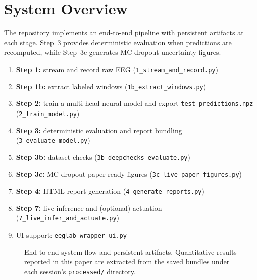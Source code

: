 \documentclass[conference]{IEEEtran}
\begin{document}
\section{System Overview}

The repository implements an end-to-end pipeline with persistent artifacts at each stage. Step~3 provides deterministic evaluation when predictions are recomputed, while Step~3c generates MC-dropout uncertainty figures.

\begin{enumerate}
\item \textbf{Step 1:} stream and record raw EEG (\texttt{1\_stream\_and\_record.py})
\item \textbf{Step 1b:} extract labeled windows (\texttt{1b\_extract\_windows.py})
\item \textbf{Step 2:} train a multi-head neural model and export \texttt{test\_predictions.npz} (\texttt{2\_train\_model.py})
\item \textbf{Step 3:} deterministic evaluation and report bundling (\texttt{3\_evaluate\_model.py})
\item \textbf{Step 3b:} dataset checks (\texttt{3b\_deepchecks\_evaluate.py})
\item \textbf{Step 3c:} MC-dropout paper-ready figures (\texttt{3c\_live\_paper\_figures.py})
\item \textbf{Step 4:} HTML report generation (\texttt{4\_generate\_reports.py})
\item \textbf{Step 7:} live inference and (optional) actuation (\texttt{7\_live\_infer\_and\_actuate.py})
\item UI support: \texttt{eeglab\_wrapper\_ui.py}
\end{enumerate}

\begin{figure}[t]
\centering
{}
\caption{End-to-end system flow and persistent artifacts. Quantitative results reported in this paper are extracted from the saved bundles under each session’s \texttt{processed/} directory.}
\end{figure}
\end{document}
